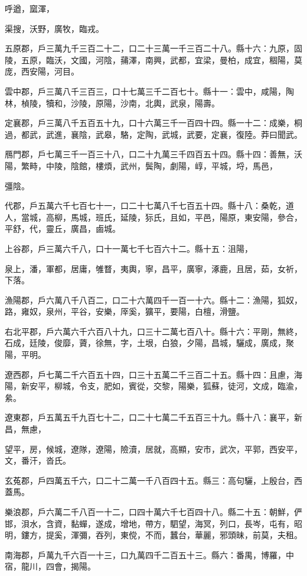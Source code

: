 \begin{pinyinscope}
呼遒，窳渾，

渠搜，沃野，廣牧，臨戎。

五原郡，戶三萬九千三百二十二，口二十三萬一千三百二十八。縣十六：九原，固陵，五原，臨沃，文國，河陰，蒱澤，南興，武都，宜梁，曼柏，成宜，稒陽，莫庞，西安陽，河目。

雲中郡，戶三萬八千三百三，口十七萬三千二百七十。縣十一：雲中，咸陽，陶林，楨陵，犢和，沙陵，原陽，沙南，北輿，武泉，陽壽。

定襄郡，戶三萬八千五百五十九，口十六萬三千一百四十四。縣一十二：成樂，桐過，都武，武進，襄陰，武皋，駱，定陶，武城，武要，定襄，復陸。莽曰聞武。

鴈門郡，戶七萬三千一百三十八，口二十九萬三千四百五十四。縣十四：善無，沃陽，繁畤，中陵，陰館，樓煩，武州，鬓陶，劇陽，崞，平城，埒，馬邑，

彊陰。

代郡，戶五萬六千七百七十一，口二十七萬八千七百五十四。縣十八：桑乾，道人，當城，高柳，馬城，班氏，延陵，狋氏，且如，平邑，陽原，東安陽，參合，平舒，代，靈丘，廣昌，鹵城。

上谷郡，戶三萬六千八，口十一萬七千七百六十二。縣十五：沮陽，

泉上，潘，軍都，居庸，雊瞀，夷輿，寧，昌平，廣寧，涿鹿，且居，茹，女祈，下落。

漁陽郡，戶六萬八千八百二，口二十六萬四千一百一十六。縣十二：漁陽，狐奴，路，雍奴，泉州，平谷，安樂，厗奚，獷平，要陽，白檀，滑鹽。

右北平郡，戶六萬六千六百八十九，口三十二萬七百八十。縣十六：平剛，無終，石成，廷陵，俊靡，薋，徐無，字，土垠，白狼，夕陽，昌城，驪成，廣成，聚陽，平明。

遼西郡，戶七萬二千六百五十四，口三十五萬二千三百二十五。縣十四：且慮，海陽，新安平，柳城，令支，肥如，賓從，交黎，陽樂，狐蘇，徒河，文成，臨渝，絫。

遼東郡，戶五萬五千九百七十二，口二十七萬二千五百三十九。縣十八：襄平，新昌，無慮，

望平，房，候城，遼隊，遼陽，險瀆，居就，高顯，安市，武次，平郭，西安平，文，番汗，沓氏。

玄菟郡，戶四萬五千六，口二十二萬一千八百四十五。縣三：高句驪，上殷台，西蓋馬。

樂浪郡，戶六萬二千八百一十二，口四十萬六千七百四十八。縣二十五：朝鮮，俨邯，浿水，含資，黏蟬，遂成，增地，帶方，駟望，海冥，列口，長岑，屯有，昭明，鏤方，提奚，渾彌，吞列，東傥，不而，蠶台，華麗，邪頭昧，前莫，夫租。

南海郡，戶萬九千六百一十三，口九萬四千二百五十三。縣六：番禺，博羅，中宿，龍川，四會，揭陽。


\end{pinyinscope}
